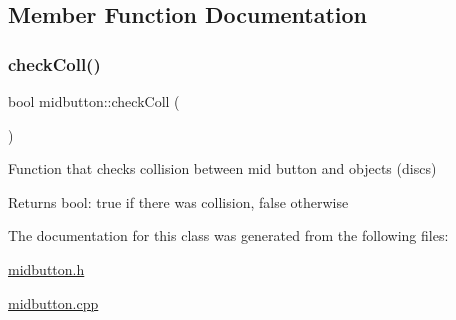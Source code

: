\subsection{Member Function Documentation}
\mbox{\label{classmidbutton_a6a711973ae7e7d0a3d98f0581130521d}} 
\subsubsection{\texorpdfstring{check\+Coll()}{checkColl()}}
{\footnotesize\ttfamily bool midbutton\+::check\+Coll (\begin{DoxyParamCaption}{ }\end{DoxyParamCaption})}



Function that checks collision between mid button and objects (discs) 

\begin{DoxyReturn}{Returns}
bool\+: true if there was collision, false otherwise 
\end{DoxyReturn}


The documentation for this class was generated from the following files\+:\begin{DoxyCompactItemize}
\item 
\hyperlink{midbutton_8h}{midbutton.\+h}\item 
\hyperlink{midbutton_8cpp}{midbutton.\+cpp}\end{DoxyCompactItemize}
